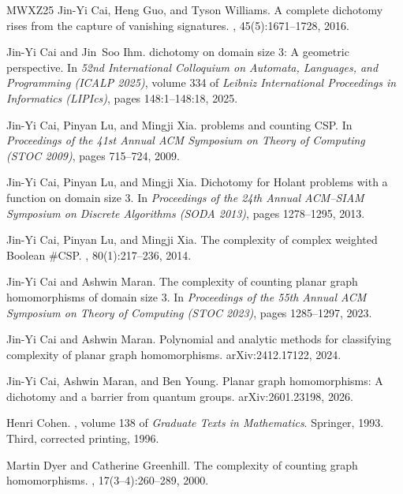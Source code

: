 \documentclass[11pt,letterpaper,onecolumn]{article}
\theoremstyle{plain}
\theoremstyle{definition}
\theoremstyle{remark}
\begin{document}
\begin{thebibliography}{MWXZ25}
Jin-Yi Cai, Heng Guo, and Tyson Williams.
\newblock A complete dichotomy rises from the capture of vanishing signatures.
, 45(5):1671--1728, 2016.

Jin-Yi Cai and Jin~Soo Ihm.
 dichotomy on domain size 3: A geometric
  perspective.
\newblock In {\em 52nd International Colloquium on Automata, Languages, and
  Programming (ICALP 2025)}, volume 334 of {\em Leibniz International
  Proceedings in Informatics (LIPIcs)}, pages 148:1--148:18, 2025.

Jin-Yi Cai, Pinyan Lu, and Mingji Xia.
 problems and counting {CSP}.
\newblock In {\em Proceedings of the 41st Annual ACM Symposium on Theory of
  Computing (STOC 2009)}, pages 715--724, 2009.

Jin-Yi Cai, Pinyan Lu, and Mingji Xia.
\newblock Dichotomy for {Holant} problems with a function on domain size 3.
\newblock In {\em Proceedings of the 24th Annual ACM--SIAM Symposium on
  Discrete Algorithms (SODA 2013)}, pages 1278--1295, 2013.

Jin-Yi Cai, Pinyan Lu, and Mingji Xia.
\newblock The complexity of complex weighted {Boolean} {{\#CSP}}.
, 80(1):217--236, 2014.

Jin-Yi Cai and Ashwin Maran.
\newblock The complexity of counting planar graph homomorphisms of domain size
  3.
\newblock In {\em Proceedings of the 55th Annual ACM Symposium on Theory of
  Computing (STOC 2023)}, pages 1285--1297, 2023.

Jin-Yi Cai and Ashwin Maran.
\newblock Polynomial and analytic methods for classifying complexity of planar
  graph homomorphisms.
\newblock arXiv:2412.17122, 2024.

Jin-Yi Cai, Ashwin Maran, and Ben Young.
\newblock Planar graph homomorphisms: A dichotomy and a barrier from quantum
  groups.
\newblock arXiv:2601.23198, 2026.

Henri Cohen.
, volume 138
  of {\em Graduate Texts in Mathematics}.
\newblock Springer, 1993.
\newblock Third, corrected printing, 1996.

Martin Dyer and Catherine Greenhill.
\newblock The complexity of counting graph homomorphisms.
, 17(3--4):260--289, 2000.


\end{thebibliography}
\end{document}

